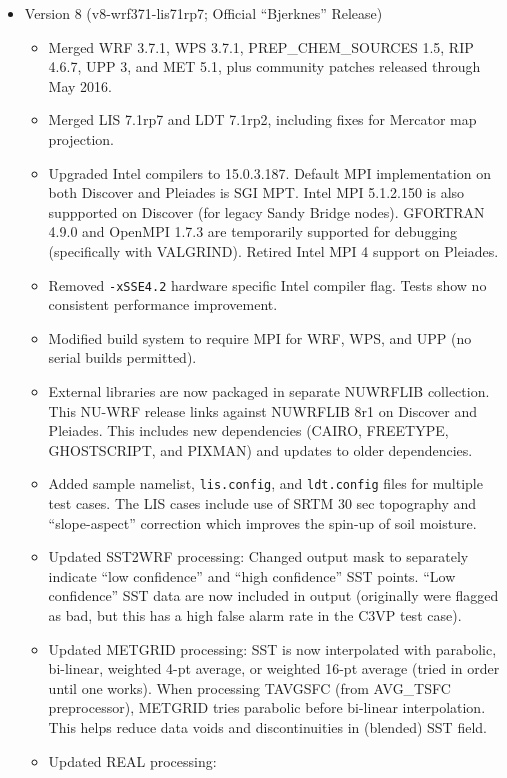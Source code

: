 \begin{itemize}
\item Version 8 (v8-wrf371-lis71rp7; Official ``Bjerknes'' Release)
  \begin{itemize}
  \item Merged WRF 3.7.1, WPS 3.7.1, PREP\_CHEM\_SOURCES 1.5, RIP 4.6.7,
    UPP 3, and MET 5.1, plus community patches released through May 2016.
  \item Merged LIS 7.1rp7 and LDT 7.1rp2, including fixes for Mercator map
    projection.
  \item Upgraded Intel compilers to 15.0.3.187.  Default MPI implementation
    on both Discover and Pleiades is SGI MPT.  Intel MPI 5.1.2.150 is also 
    suppported on Discover (for legacy Sandy Bridge nodes).  GFORTRAN 4.9.0 
    and OpenMPI 1.7.3 are temporarily supported for debugging (specifically 
    with VALGRIND). Retired Intel MPI 4 support on Pleiades.
  \item Removed \texttt{-xSSE4.2} hardware specific Intel compiler flag.  
    Tests show no consistent performance improvement.
  \item Modified build system to require MPI for WRF, WPS, and UPP (no
    serial builds permitted).
  \item External libraries are now packaged in separate NUWRFLIB collection.
    This NU-WRF release links against NUWRFLIB 8r1 on Discover and Pleiades.
    This includes new dependencies (CAIRO, FREETYPE, GHOSTSCRIPT, and PIXMAN)
    and updates to older dependencies.
  \item Added sample namelist, \texttt{lis.config}, and \texttt{ldt.config} 
    files for multiple test cases.  The LIS cases include use of SRTM 30 sec 
    topography and ``slope-aspect'' correction which improves the spin-up of 
    soil moisture.
  \item Updated SST2WRF processing:  Changed output mask to separately indicate
    ``low confidence'' and ``high confidence'' SST points.  ``Low confidence''
    SST data are now included in output (originally were flagged as bad, but
    this has a high false alarm rate in the C3VP test case).
  \item Updated METGRID processing:  SST is now interpolated with parabolic,
    bi-linear, weighted 4-pt average, or weighted 16-pt average (tried in order
    until one works).  When processing TAVGSFC (from AVG\_TSFC preprocessor),
    METGRID tries parabolic before bi-linear interpolation.  This helps reduce
    data voids and discontinuities in (blended) SST field.
  \item Updated REAL processing:

\end{itemize}
\end{itemize}
